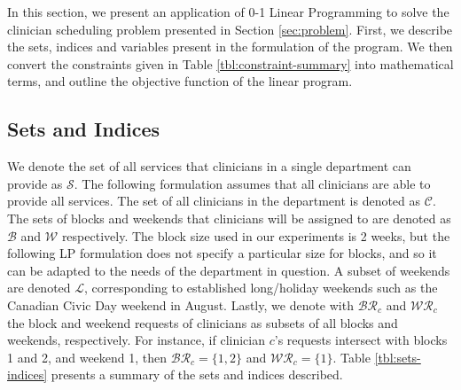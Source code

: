 In this section, we present an application of 0-1 Linear Programming to solve the clinician scheduling problem presented in Section \ref{sec:problem}. First, we describe the sets, indices and variables present in the formulation of the program. We then convert the constraints given in Table \ref{tbl:constraint-summary} into mathematical terms, and outline the objective function of the linear program.

\subsection{Sets and Indices} \label{sec:meth-sets-indices}
We denote the set of all services %
that clinicians in a single department can provide as $\mathcal{S}$. The following formulation assumes that all clinicians are able to provide all services. The set of all clinicians in the department is denoted as $\mathcal{C}$. The sets of blocks and weekends that clinicians will be assigned to are denoted as $\mathcal{B}$ and $\mathcal{W}$ respectively. The block size used in our experiments is 2 weeks, but the following LP formulation does not specify a particular size for blocks, and so it can be adapted to the needs of the department in question.
A subset of weekends are denoted $\mathcal{L}$, corresponding to established long/holiday weekends such as the Canadian Civic Day weekend in August. Lastly, we denote with $\mathcal{BR}_c$ and $\mathcal{WR}_c$ the block and weekend requests of clinicians as subsets of all blocks and weekends, respectively. For instance, if clinician $c$'s requests intersect with blocks 1 and 2, and weekend 1, then $\mathcal{BR}_c = \{1, 2\}$ and $\mathcal{WR}_c = \{1\}$. Table \ref{tbl:sets-indices} presents a summary of the sets and indices described. 

